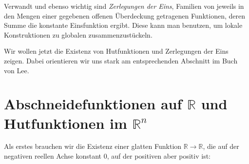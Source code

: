 \documentclass[a4paper]{scrreprt}
\numberwithin{equation}{chapter}
\newcommand{\R}{\mathbb{R}}
\theoremstyle{definition}
\begin{document}
Verwandt und ebenso wichtig sind \emph{Zerlegungen der Eins}, Familien von jeweils in den Mengen einer gegebenen offenen Überdeckung getragenen Funktionen, deren Summe die konstante Einsfunktion ergibt. Diese kann man benutzen, um lokale Konstruktionen zu globalen \glqq zusammenzustückeln\grqq.

Wir wollen jetzt die Existenz von Hutfunktionen und Zerlegungen der Eins zeigen. Dabei orientieren wir uns stark am entsprechenden Abschnitt im Buch von Lee.

\section{Abschneidefunktionen auf $\R$ und Hutfunktionen im $\R^n$}
Als erstes brauchen wir die Existenz einer glatten Funktion $\R\to\R$, die auf der negativen reellen Achse konstant 0, auf der positiven aber positiv ist:
\end{document}

